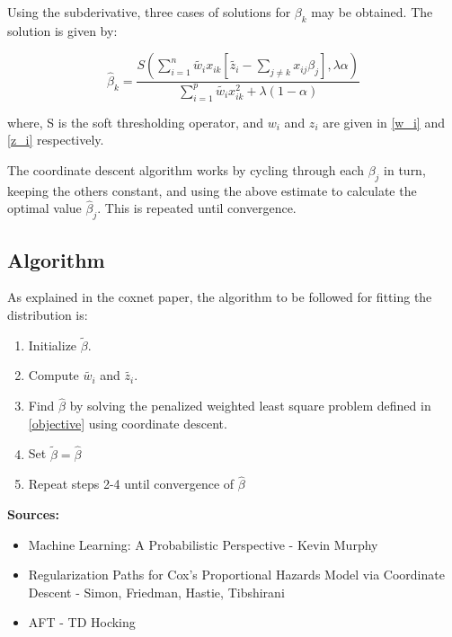 \documentclass[12pt,a4paper]{report}
\begin{document}
Using the subderivative, three cases of solutions for $\beta_k$ may be obtained. The solution is given by:

\begin{equation}
\hat \beta_k = \frac{S\left(\sum_{i=1}^n \widetilde{w_i} x_{ik} \left[\widetilde{ z_i} - \sum_{j \ne k} x_{ij} \beta_j \right], \lambda \alpha \right)}
					{\sum_{i=1}^p \widetilde{w_i} x_{ik}^2 + \lambda (1- \alpha)}
\end{equation}

where, S is the soft thresholding operator, and $w_i$ and $z_i$ are given in \ref{w_i} and \ref{z_i} respectively.

The coordinate descent algorithm works by
cycling through each $\beta_j$ in turn, keeping the others constant, and using the above estimate to calculate the optimal value
$\hat \beta_j$. This is repeated until convergence.

\subsection*{Algorithm}
As explained in the coxnet paper, the algorithm to be followed for fitting the distribution is:
\begin{enumerate}
\item Initialize $\widetilde{ \beta}$.
\item Compute $\widetilde{ w_i}$ and $\widetilde{ z_i}$.
\item Find $\hat \beta$ by solving the penalized weighted least square problem defined in \ref{objective} using coordinate descent.
\item Set $\widetilde{ \beta} = \hat \beta$
\item Repeat steps 2-4 until convergence of $\hat \beta$
\end{enumerate}

\vspace{8mm}
\textbf{Sources:}
\begin{itemize}
\item Machine Learning: A Probabilistic Perspective - Kevin Murphy
\item Regularization Paths for Cox's Proportional Hazards Model via Coordinate Descent - Simon, Friedman, Hastie, Tibshirani
\item AFT - TD Hocking
\end{itemize}
\end{document}
